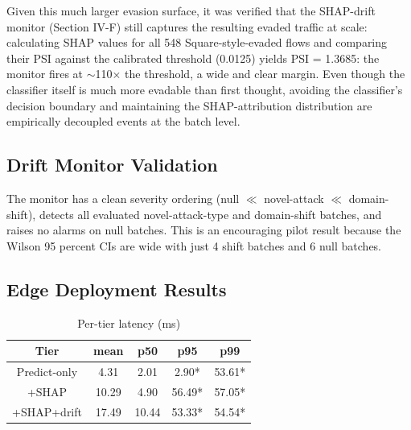 \documentclass[conference]{IEEEtran}
\begin{document}
Given this much larger evasion surface, it was verified that the SHAP-drift monitor (Section IV-F) still captures the resulting evaded traffic at scale: calculating SHAP values for all 548 Square-style-evaded flows and comparing their PSI against the calibrated threshold (0.0125) yields PSI = 1.3685: the monitor fires at $\sim$110$\times$ the threshold, a wide and clear margin. Even though the classifier itself is much more evadable than first thought, avoiding the classifier's decision boundary and maintaining the SHAP-attribution distribution are empirically decoupled events at the batch level.

\subsection{Drift Monitor Validation}

\begin{table}[htbp]
\caption{Drift monitor validation}
\begin{center}
\footnotesize
{}
\label{tab6}
\end{center}
\end{table}

The monitor has a clean severity ordering (null $\ll$ novel-attack $\ll$ domain-shift), detects all evaluated novel-attack-type and domain-shift batches, and raises no alarms on null batches. This is an encouraging pilot result because the Wilson 95 percent CIs are wide with just 4 shift batches and 6 null batches.

\subsection{Edge Deployment Results}

\begin{table}[htbp]
\caption{Per-tier latency (ms)}
\begin{center}
\footnotesize
\begin{tabular}{|c|c|c|c|c|}
\hline
\textbf{Tier} & \textbf{mean} & \textbf{p50} & \textbf{p95} & \textbf{p99} \\
\hline
Predict-only & 4.31 & 2.01 & 2.90* & 53.61* \\
\hline
+SHAP & 10.29 & 4.90 & 56.49* & 57.05* \\
\hline
+SHAP+drift & 17.49 & 10.44 & 53.33* & 54.54* \\
\hline
\end{tabular}
\label{tab7}
\end{center}
\end{table}
\end{document}
